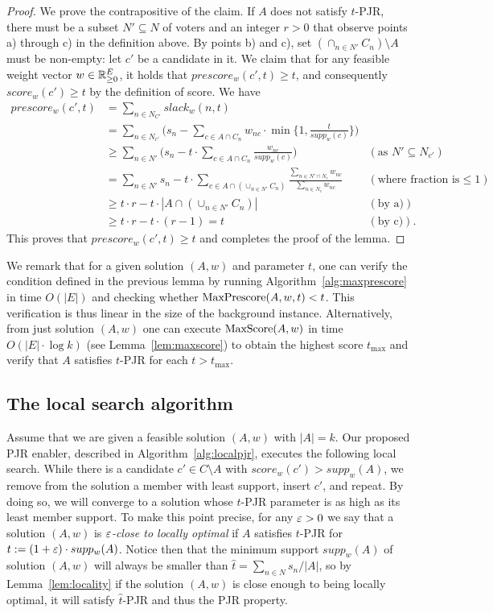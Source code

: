 \begin{proof} 
We prove the contrapositive of the claim. If $A$ does not satisfy $t$-PJR, there must be a subset $N'\subseteq N$ of voters and an integer $r>0$ that observe points a) through c) in the definition above. By points b) and c), set $(\cap_{n\in N'} C_n)\setminus A$ must be non-empty: let $c'$ be a candidate in it. We claim that for any feasible weight vector $w\in \mathbb{R}_{\geq 0}^E$, it holds that $prescore_w(c',t)\geq t$, and consequently $score_w(c')\geq t$ by the definition of score. We have
%
\begin{align*} prescore_w(c',t) &= \sum_{n\in N_{C'}}  slack_w(n,t) \\
&= \sum_{n\in N_{c'}} \Big(s_n - \sum_{c\in A\cap C_n} w_{nc}\cdot \min\Big\{1, \frac{t}{supp_w(c)}\Big\}\Big) \\
&\geq \sum_{n\in N'} \Big(s_n - t\cdot \sum_{c\in A\cap C_n} \frac{w_{nc}}{supp_w(c)}\Big) & (\text{as } N'\subseteq N_{c'})\\
&= \sum_{n\in N'} s_n - t\cdot \sum_{c\in A\cap(\cup_{n\in N'} C_n)} \frac{\sum_{n\in N'\cap N_c} w_{nc}}{\sum_{n\in N_c} w_{nc}} 
& (\text{where fraction is } \leq 1)\\ 
&\geq t\cdot r - t\cdot |A\cap (\cup_{n\in N'} C_n)| & (\text{by a)})\\
& \geq t\cdot r - t\cdot (r-1) = t & (\text{by c)}). \end{align*}
%
This proves that $prescore_w(c',t) \geq t$ and completes the proof of the lemma.
\end{proof}

We remark that for a given solution $(A,w)$ and parameter $t$, one can verify the condition defined in the previous lemma by running Algorithm~\ref{alg:maxprescore} in time $O(|E|)$ and checking whether $\operatorname{MaxPrescore}(A,w,t)<t$. This verification is thus linear in the size of the background instance. Alternatively, from just solution $(A,w)$ one can execute $\operatorname{MaxScore}(A,w)$ in time $O(|E|\cdot \log k)$ (see Lemma~\ref{lem:maxscore}) to obtain the highest score $t_{\max}$ and verify that $A$ satisfies $t$-PJR for each $t>t_{\max}$.

\subsection{The local search algorithm}

Assume that we are given a feasible solution $(A,w)$ with $|A|=k$. Our proposed PJR enabler, described in Algorithm~\ref{alg:localpjr}, executes the following local search. 
While there is a candidate $c'\in C\setminus A$ with $score_w(c')>supp_w(A)$, we remove from the solution a member with least support, insert $c'$, and repeat. 
By doing so, we will converge to a solution whose $t$-PJR parameter is as high as its least member support. 
To make this point precise, for any $\varepsilon>0$ we say that a solution $(A,w)$ is \emph{$\varepsilon$-close to locally optimal} if $A$ satisfies $t$-PJR for $t:=(1+\varepsilon)\cdot supp_{w}(A)$. 
Notice then that the minimum support $supp_{w}(A)$ of solution $(A,w)$ will always be smaller than $\hat{t}=\sum_{n\in N} s_n / |A|$, 
so by Lemma~\ref{lem:locality} if the solution $(A,w)$ is close enough to being locally optimal, it will satisfy $\hat{t}$-PJR and thus the PJR property.

